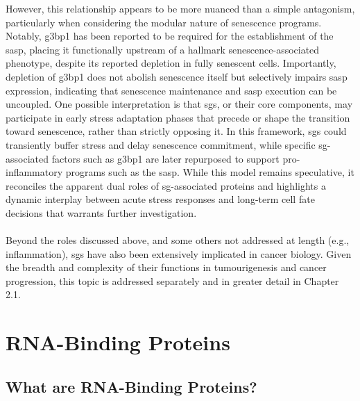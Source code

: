 However, this relationship appears to be more nuanced than a simple antagonism, particularly when considering the modular nature of senescence programs. Notably, \gls{g3bp1} has been reported to be required for the establishment of the \gls{sasp}\cite{omer_g3bp1_2020}, placing it functionally upstream of a hallmark senescence-associated phenotype, despite its reported depletion in fully senescent cells\cite{moujaber_dissecting_2017}. Importantly, depletion of \gls{g3bp1} does not abolish senescence itself but selectively impairs \gls{sasp} expression\cite{omer_g3bp1_2020}, indicating that senescence maintenance and \gls{sasp} execution can be uncoupled\cite{omer_g3bp1_2020}. One possible interpretation is that \glspl{sg}, or their core components, may participate in early stress adaptation phases that precede or shape the transition toward senescence, rather than strictly opposing it. In this framework, \glspl{sg} could transiently buffer stress and delay senescence commitment, while specific \gls{sg}-associated factors such as \gls{g3bp1} are later repurposed to support pro-inflammatory programs such as the \gls{sasp}. While this model remains speculative, it reconciles the apparent dual roles of \gls{sg}-associated proteins and highlights a dynamic interplay between acute stress responses and long-term cell fate decisions that warrants further investigation.
\\
\\
Beyond the roles discussed above, and some others not addressed at length (e.g., inflammation\cite{paget_stress_2023}), \glspl{sg} have also been extensively implicated in cancer biology\cite{anderson_stress_2015}. Given the breadth and complexity of their functions in tumourigenesis and cancer progression, this topic is addressed separately and in greater detail in Chapter 2.1.

\section{RNA-Binding Proteins}

\subsection{What are RNA-Binding Proteins?}

